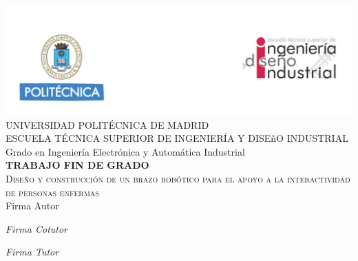 \begin{titlepage}
\begin{center}

 \includegraphics[width=1\textwidth]{figuras/cabecera.png}  \\[0.5 cm]

\LARGE UNIVERSIDAD POLITÉCNICA DE MADRID \\ [1 cm]

\LARGE ESCUELA TÉCNICA SUPERIOR DE INGENIERÍA Y DISEñO INDUSTRIAL \\ [1 cm]

\LARGE Grado en Ingeniería Electrónica y Automática Industrial\\ [1 cm]

\LARGE \textbf{TRABAJO FIN DE GRADO}\\[1 cm]

\Huge \textsc{Diseño y construcción de un brazo robótico para el apoyo a la interactividad de personas enfermas}\\[3 cm]

\Large Firma Autor \\[2 cm]


\begin{multicols}{2} 
\begin{flushleft} 
\Large \emph{Firma Cotutor}
\end{flushleft}

\begin{flushright} 
\Large \emph{Firma Tutor}
\end{flushright}

\end{multicols} 

\vfill

\end{center}
\end{titlepage}